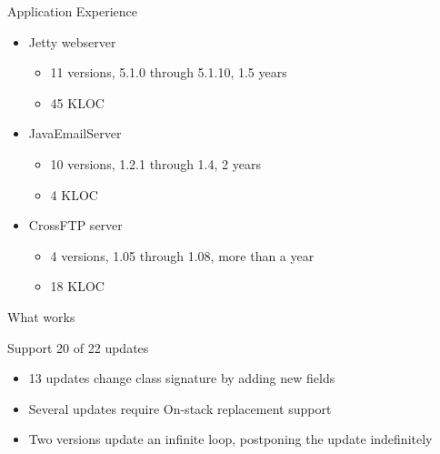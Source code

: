 \begin{frame}{Application Experience}%
\begin{itemize}
\item Jetty webserver
  \begin{itemize}
  \item 11 versions, 5.1.0 through 5.1.10, 1.5 years
  \item 45 KLOC
  \end{itemize}
\item JavaEmailServer
  \begin{itemize}
  \item 10 versions, 1.2.1 through 1.4, 2 years
  \item 4 KLOC
  \end{itemize}
\item CrossFTP server
  \begin{itemize}
  \item 4 versions, 1.05 through 1.08, more than a year
  \item 18 KLOC
  \end{itemize}
\end{itemize}
\end{frame}

\begin{frame}{What works}%
\begin{center}
{\Large Support 20 of 22 updates}
\end{center}
\vspace{2ex}
\begin{itemize}
\item 13 updates change class signature by adding new fields
\item Several updates require On-stack replacement support
\item Two versions update an infinite loop, postponing the update
indefinitely
\end{itemize}
\end{frame}


